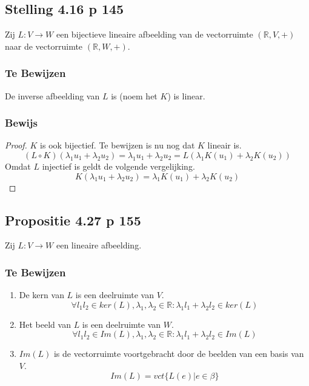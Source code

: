 \documentclass[lineaire_algebra_oplossingen.tex]{subfiles}
\begin{document}
\subsection{Stelling 4.16 p 145}
Zij $L:V\rightarrow W$ een bijectieve lineaire afbeelding van de vectorruimte $(\mathbb{R},V,+)$ naar de vectorruimte $(\mathbb{R},W,+)$.
\subsubsection*{Te Bewijzen}
De inverse afbeelding van $L$ is (noem het $K$) is linear.
\subsubsection*{Bewijs}
\begin{proof}
$K$ is ook bijectief. Te bewijzen is nu nog dat $K$ lineair is.
\[
(L\circ K)(\lambda_1u_1 + \lambda_2u_2) = \lambda_1u_1 + \lambda_2u_2 = L(\lambda_1K(u_1) + \lambda_2K(u_2))
\]
Omdat $L$ injectief is geldt de volgende vergelijking.
\[
K(\lambda_1u_1 + \lambda_2u_2) = \lambda_1K(u_1) + \lambda_2K(u_2)
\]
\end{proof}

\subsection{Propositie 4.27 p 155}
Zij $L: V\rightarrow W$ een lineaire afbeelding.
\subsubsection*{Te Bewijzen}
\begin{enumerate}
\item De kern van $L$ is een deelruimte van $V$.
\[
\forall l_1l_2\in ker(L), \lambda_1,\lambda_2\in \mathbb{R}: \lambda_1l_1+\lambda_2l_2 \in ker(L)
\]
\item Het beeld van $L$ is een deelruimte van $W$.
\[
\forall l_1l_2\in Im(L), \lambda_1,\lambda_2\in \mathbb{R}: \lambda_1l_1+\lambda_2l_2 \in Im(L)
\]
\item $Im(L)$ is de vectorruimte voortgebracht door de beelden van een basis van $V$.
\[
Im(L) = vct\{L(e)|e\in \beta\}
\]
\end{enumerate}
\end{document}
